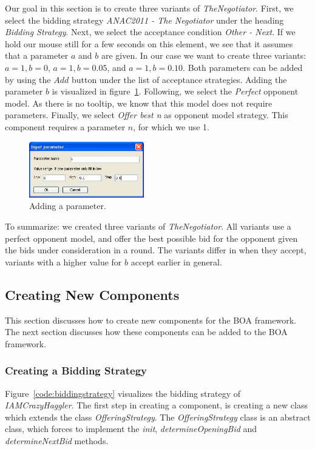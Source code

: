 \documentclass[]{article}
\begin{document}
Our goal in this section is to create three variants of \textit{TheNegotiator}. First, we select the bidding strategy \textit{ANAC2011 - The Negotiator} under the heading \textit{Bidding Strategy}. Next, we select the acceptance condition \textit{Other - Next}. If we hold our mouse still for a few seconds on this element, we see that it assumes that a parameter $a$ and $b$ are given. In our case we want to create three variants: $a=1, b=0$, $a=1, b=0.05$, and $a=1, b=0.10$. Both parameters can be added by using the $Add$ button under the list of acceptance strategies. Adding the parameter $b$ is visualized in figure~\ref{fig:decoupledparam}. Following, we select the \textit{Perfect} opponent model. As there is no tooltip, we know that this model does not require parameters. Finally, we select \textit{Offer best n} as opponent model strategy. This component requires a parameter $n$, for which we use 1.

\begin{figure}[h!] 
	\center
	\includegraphics[width=5cm]{media/Decoupled_Param.png}
	\caption{Adding a parameter.}
	\label{fig:decoupledparam}
\end{figure}

To summarize: we created three variants of \textit{TheNegotiator}. All variants use a perfect opponent model, and offer the best possible bid for the opponent given the bids under consideration in a round. The variants differ in when they accept, variants with a higher value for $b$ accept earlier in general.

\subsection{Creating New Components}
This section discusses how to create new components for the BOA framework. The next section discusses how these components can be added to the BOA framework.

\subsubsection{Creating a Bidding Strategy}
Figure~\ref{code:biddingstrategy} visualizes the bidding strategy of \textit{IAMCrazyHaggler}. The first step in creating a component, is creating a new class which extends the class \textit{OfferingStrategy}. The \textit{OfferingStrategy} class is an abstract class, which forces to implement the \textit{init}, \textit{determineOpeningBid} and \textit{determineNextBid} methods.
\end{document}
